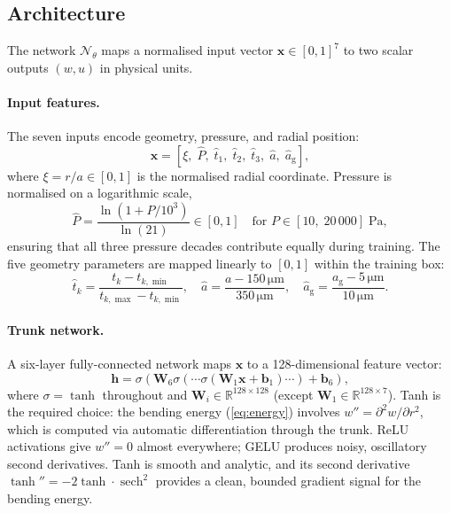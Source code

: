 \documentclass[review,12pt]{elsarticle}
\begin{document}
\subsection{Architecture}
\label{sec:arch}

The network $\mathcal{N}_\theta$ maps a normalised input vector $\mathbf{x}
\in [0,1]^7$ to two scalar outputs $(w, u)$ in physical units.

\paragraph{Input features.}
The seven inputs encode geometry, pressure, and radial position:
\begin{equation}
    \mathbf{x} = \left[
        \xi,\;
        \hat{P},\;
        \hat{t}_1,\;
        \hat{t}_2,\;
        \hat{t}_3,\;
        \hat{a},\;
        \hat{a}_\mathrm{g}
    \right],
    \label{eq:input}
\end{equation}
where $\xi = r/a \in [0,1]$ is the normalised radial coordinate. Pressure is
normalised on a logarithmic scale,
\begin{equation}
    \hat{P} = \frac{\ln(1 + P/10^3)}{\ln(21)} \in [0,1]
    \quad \text{for } P \in [10,\;20\,000]\;\si{\pascal},
    \label{eq:Pnorm}
\end{equation}
ensuring that all three pressure decades contribute equally during training.
The five geometry parameters are mapped linearly to $[0,1]$ within the
training box:
\begin{equation}
    \hat{t}_k = \frac{t_k - t_{k,\min}}{t_{k,\max} - t_{k,\min}}, \quad
    \hat{a} = \frac{a - 150\,\si{\micro\metre}}{350\,\si{\micro\metre}}, \quad
    \hat{a}_\mathrm{g} = \frac{a_\mathrm{g} - 5\,\si{\micro\metre}}{10\,\si{\micro\metre}}.
    \label{eq:geonorm}
\end{equation}

\paragraph{Trunk network.}
A six-layer fully-connected network maps $\mathbf{x}$ to a 128-dimensional
feature vector:
\begin{equation}
    \mathbf{h} = \sigma(\mathbf{W}_6 \sigma(\cdots \sigma(\mathbf{W}_1 \mathbf{x}
                + \mathbf{b}_1)\cdots) + \mathbf{b}_6),
    \label{eq:trunk}
\end{equation}
where $\sigma = \tanh$ throughout and $\mathbf{W}_i \in \mathbb{R}^{128\times
128}$ (except $\mathbf{W}_1 \in \mathbb{R}^{128\times 7}$). Tanh is the
required choice: the bending energy (\cref{eq:energy}) involves
$w'' = \partial^2 w / \partial r^2$, which is computed via automatic
differentiation through the trunk. ReLU activations give $w'' = 0$ almost
everywhere; GELU produces noisy, oscillatory second derivatives. Tanh is
smooth and analytic, and its second derivative $\tanh'' = -2\tanh \cdot
\operatorname{sech}^2$ provides a clean, bounded gradient signal for the
bending energy.
\end{document}
